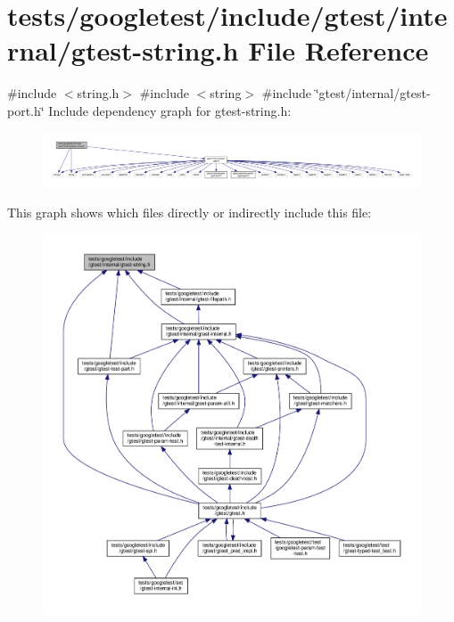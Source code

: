 \hypertarget{gtest-string_8h}{}\section{tests/googletest/include/gtest/internal/gtest-\/string.h File Reference}
\label{gtest-string_8h}
{\ttfamily \#include $<$string.\+h$>$}\newline
{\ttfamily \#include $<$string$>$}\newline
{\ttfamily \#include \char`\"{}gtest/internal/gtest-\/port.\+h\char`\"{}}\newline
Include dependency graph for gtest-\/string.h\+:\nopagebreak
\begin{figure}[H]
\begin{center}
\leavevmode
\includegraphics[width=350pt]{gtest-string_8h__incl}
\end{center}
\end{figure}
This graph shows which files directly or indirectly include this file\+:\nopagebreak
\begin{figure}[H]
\begin{center}
\leavevmode
\includegraphics[width=350pt]{gtest-string_8h__dep__incl}
\end{center}
\end{figure}
